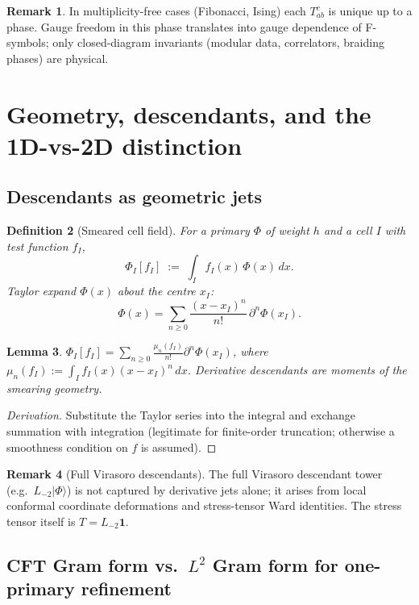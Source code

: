 \documentclass[11pt,a4paper]{article}
\newtheorem{definition}{Definition}[section]
\newtheorem{lemma}[definition]{Lemma}
\theoremstyle{definition}
\newtheorem{remark}[definition]{Remark}
\newcommand{\one}{\mathbf{1}}
\begin{document}
\begin{remark}
In multiplicity-free cases (Fibonacci, Ising) each $T^c_{ab}$ is unique up
to a phase. Gauge freedom in this phase translates into gauge dependence of
F-symbols; only closed-diagram invariants (modular data, correlators,
braiding phases) are physical.
\end{remark}

\section{Geometry, descendants, and the 1D-vs-2D distinction}

\subsection{Descendants as geometric jets}

\begin{definition}[Smeared cell field]\label{def:smear}
For a primary $\Phi$ of weight $h$ and a cell $I$ with test function $f_I$,
\[
\Phi_I[f_I] \;:=\; \int_I f_I(x)\,\Phi(x)\,dx.
\]
Taylor expand $\Phi(x)$ about the centre $x_I$:
\[
\Phi(x) = \sum_{n\ge 0}\frac{(x-x_I)^{n}}{n!}\,\partial^{n}\Phi(x_I).
\]
\end{definition}

\begin{lemma}\label{lem:moments}
$\Phi_I[f_I] = \sum_{n\ge 0}\frac{\mu_n(f_I)}{n!}\partial^{n}\Phi(x_I)$, where
$\mu_n(f_I) := \int_I f_I(x)(x-x_I)^{n}\,dx$. Derivative descendants are
moments of the smearing geometry.
\end{lemma}

\begin{proof}[Derivation] Substitute the Taylor series into the integral
and exchange summation with integration (legitimate for finite-order
truncation; otherwise a smoothness condition on $f$ is assumed). \end{proof}

\begin{remark}[Full Virasoro descendants]\label{rem:Virasoro}
The full Virasoro descendant tower (e.g.\ $L_{-2}|\Phi\rangle$) is not
captured by derivative jets alone; it arises from local conformal coordinate
deformations and stress-tensor Ward identities. The stress tensor itself
is $T=L_{-2}\one$.
\end{remark}

\subsection{CFT Gram form vs.\ $L^{2}$ Gram form for one-primary refinement}\label{sec:gram-vs-L2}
\end{document}
